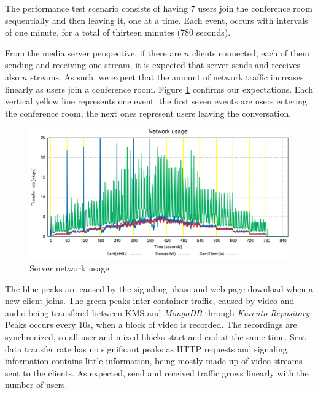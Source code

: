 \documentclass[10pt,conference]{IEEEtran}
\begin{document}
The performance test scenario consists of having 7 users join the conference room sequentially and then leaving it, one at a time.
Each event, occurs with intervals of one minute, for a total of thirteen minutes (780 seconds).
  
From the media server perspective, if there are $n$ clients connected, each of them sending and receiving one stream, it is expected that server sends and receives also $n$ streams.
As such, we expect that the amount of network traffic increases linearly as users join a conference room.
Figure \ref{fig:test_full_features_net} confirms our expectations.
Each vertical yellow line represents one event: the first seven events are users entering the conference room, the next ones represent users leaving the conversation. 
     

\begin{figure}
  \centering
\includegraphics[width=\linewidth]{net_usage.png}
  \caption{Server network usage}
  \label{fig:test_full_features_net}
\end{figure}


The blue peaks are caused by the signaling phase and web page download when a new client joins.
The green peaks inter-container traffic, caused by video and audio being transfered between \gls{KMS} and \emph{MongoDB} through \emph{Kurento Repository}.
Peaks occurs every 10s, when a block of video is recorded.
The recordings are synchronized, so all user and mixed blocks start and end at the same time.
Sent data transfer rate has no significant peaks as \gls{HTTP} requests and signaling information contains little information, being mostly made up of video streams sent to the clients.
As expected, send and received traffic grows linearly with the number of users.
\end{document}
